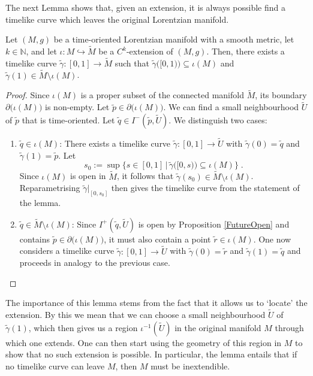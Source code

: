 \documentclass[reqno]{article}
\newcommand{\N}{\mathbb{N}}
\begin{document}
The next Lemma shows that, given an extension, it is always possible find a timelike curve which leaves the original Lorentzian manifold.

\begin{lemma}\label{schwlem:ExtensionLemma}
\label{ExtensionLemma}
Let $(M,g)$ be a time-oriented Lorentzian manifold with a smooth metric, let $k \in \N$, and let $\iota : M \hookrightarrow \tilde{M}$ be a $C^k$-extension of $(M,g)$. Then, there exists a timelike curve $\tilde{\gamma} : [0,1] \to \tilde{M}$ such that $\tilde{\gamma}\big([0,1)\big) \subseteq \iota(M)$ and $\tilde{\gamma}(1) \in \tilde{M}\setminus \iota(M)$.
\end{lemma}

\begin{proof}
Since $\iota(M)$ is a proper subset of the connected manifold $\tilde{M}$, its boundary $\partial\big(\iota(M)\big)$ is non-empty. Let $\tilde{p} \in \partial\big(\iota(M)\big)$. We can find a small neighbourhood $\tilde{U}$ of $\tilde{p}$ that is time-oriented. Let $\tilde{q} \in I^-(\tilde{p}, \tilde{U})$. We distinguish two cases:
\begin{enumerate}
\item  $\tilde{q} \in \iota(M)$: There exists a timelike curve $\tilde{\gamma} : [0,1] \to \tilde{U}$ with $\tilde{\gamma}(0) = \tilde{q}$ and $\tilde{\gamma}(1) = \tilde{p}$. Let
\begin{equation*}
s_0 := \sup \{ s \in [0,1] \, | \, \tilde{\gamma}\big([0,s)\big) \subseteq \iota(M) \} \;.
\end{equation*}
Since $\iota(M)$ is open in $\tilde{M}$, it follows that $\tilde{\gamma}(s_0) \in \tilde{M} \setminus \iota(M)$. Reparametrising $\tilde{\gamma}|_{[0,s_0]}$ then gives the timelike curve from the statement of the lemma.
\item $\tilde{q} \in \tilde{M}\setminus \iota(M)$: Since $I^+(\tilde{q},\tilde{U})$ is open by Proposition \ref{FutureOpen} and contains $\tilde{p} \in \partial\big(\iota(M)\big)$, it must also contain a point $\tilde{r} \in \iota(M)$. One now considers a timelike curve $\tilde{\gamma} : [0,1] \to \tilde{U}$ with $\tilde{\gamma}(0) = \tilde{r}$ and $\tilde{\gamma}(1) = \tilde{q}$ and proceeds in analogy to the previous case.
\end{enumerate}
\end{proof}

The importance of this lemma stems from the fact that it allows us to `locate' the extension. By this we mean that we can choose a small neighbourhood $\tilde{U}$ of $\tilde{\gamma}(1)$, which then gives us a region $\iota^{-1}(\tilde{U}) $ in the original manifold $M$ through which one extends.  One can then start using the geometry of this region in $M$ to show that no such extension is possible. In particular, the lemma entails that if no timelike curve can leave $M$, then $M$ must be inextendible.
\end{document}

